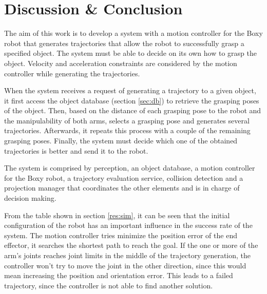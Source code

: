 

\chapter{Discussion \& Conclusion}

The aim of this work is to develop a system with a motion controller for the Boxy robot that generates trajectories that allow the robot to successfully grasp a specified object. The system must be able to decide on its own how to grasp the object. Velocity and acceleration constraints are considered by the motion controller while generating the trajectories. 

When the system receives a request of generating a trajectory to a given object, it first access the object database (section \ref{sec:db}) to retrieve the grasping poses of the object. Then, based on the distance of each grasping pose to the robot and the manipulability of both arms, selects a grasping pose and generates several trajectories. Afterwards, it repeats this process with a couple of the remaining grasping poses. Finally, the system must decide which one of the obtained trajectories is better and send it to the robot.

The system is comprised by perception, an object database, a motion controller for the Boxy robot, a trajectory evaluation service, collision detection and a projection manager that coordinates the other elements and is in charge of decision making.

From the table shown in section \ref{res:sim}, it can be seen that the initial configuration of the robot has an important influence in the success rate of the system. The motion controller tries minimize the position error of the end effector, it searches the shortest path to reach the goal. If the one or more of the arm's joints reaches joint limits in the middle of the trajectory generation, the controller won't try to move the joint in the other direction, since this would mean increasing the position and orientation error. This leads to a failed trajectory, since the controller is not able to find another solution.

